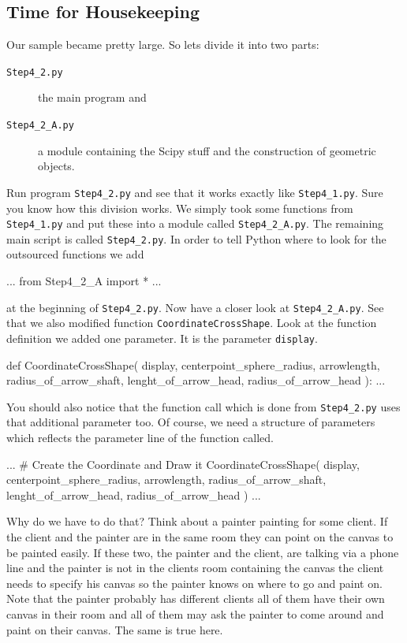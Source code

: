 \subsection{Time for Housekeeping}
Our sample became pretty large.
So lets divide it into two parts:
\begin{description}
\item [{\tt Step4\_2.py}] the main program and
\item [{\tt Step4\_2\_A.py}] a module containing the Scipy stuff and the construction of geometric objects.
\end{description}
Run program {\tt Step4\_2.py} and see that it works exactly like {\tt Step4\_1.py}.
Sure you know how this division works.
We simply took some functions from {\tt Step4\_1.py} and put these into a module called {\tt Step4\_2\_A.py}.
The remaining main script is called {\tt Step4\_2.py}.
In order to tell Python where to look for the outsourced functions we add
\begin{python}
...    
from Step4_2_A import *
...    
\end{python}
at the beginning of {\tt Step4\_2.py}.
Now have a closer look at {\tt Step4\_2\_A.py}.
See that we also modified function {\tt CoordinateCrossShape}.
Look at the function definition we added one parameter. 
It is the parameter {\tt display}.
\begin{python}
def CoordinateCrossShape(   display, 
                            centerpoint_sphere_radius,
                            arrowlength,
                            radius_of_arrow_shaft,
                            lenght_of_arrow_head,
                            radius_of_arrow_head ):
...    
\end{python}
You should also notice that the function call which is done from {\tt Step4\_2.py} uses that additional parameter too.
Of course, we need a structure of parameters which reflects the parameter line of the function called.
\begin{python}
...    
    # Create the Coordinate and Draw it
    CoordinateCrossShape(   display, 
                            centerpoint_sphere_radius,
                            arrowlength,
                            radius_of_arrow_shaft,
                            lenght_of_arrow_head,
                            radius_of_arrow_head )
...    
\end{python}
Why do we have to do that?
Think about a painter painting for some client.
If the client and the painter are in the same room they can point on the canvas to be painted easily.
If these two, the painter and the client, are talking via a phone line and the painter is not in the clients room containing the canvas the client needs to specify his canvas so the painter knows on where to go and paint on.
Note that the painter probably has different clients all of them have their own canvas in their room and all of them may ask the painter to come around and paint on their canvas.
The same is true here. 

